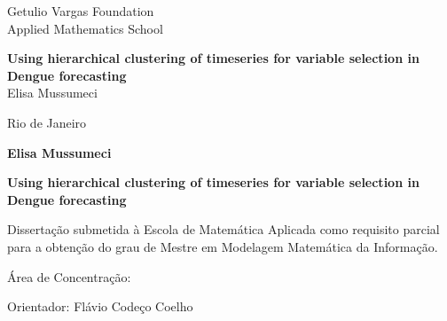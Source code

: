 \documentclass[12pt]{report}
\begin{document}
\begin{titlepage}
\begin{center}
{\LARGE Getulio Vargas Foundation}\\
\vspace{0.3cm}
{\LARGE Applied Mathematics School}\\
\vspace{0.3cm}

\par
\vspace{170pt}
  \textbf{\Large {Using hierarchical clustering of timeseries for variable selection in Dengue forecasting}
}\\
\vspace{32pt}
{\Large Elisa Mussumeci}\\
\end{center}

\par
\vfill
\begin{center}
{{\normalsize Rio de Janeiro}\\
{\normalsize \the\year}}
\end{center}
\end{titlepage}

\thispagestyle{empty}

\newpage
\begin{center}
\textbf{\LARGE Elisa Mussumeci}

\par
\vspace{200pt}
\textbf{\Large Using hierarchical clustering of timeseries for variable selection in Dengue forecasting}
\end{center}

\par
\vspace{85pt}
\hspace*{175pt}\parbox{7.6cm}{{\normalsize Dissertação submetida à Escola de Matemática Aplicada como requisito parcial para a obtenção do grau de Mestre em Modelagem Matemática da Informação.}}

\par
\vspace{1em}
\hspace*{125pt}\parbox{10.0cm}{{\normalsize Área de Concentração: }}

\par
\vspace{1em}
\hspace*{125pt}\parbox{10.0cm}{{\normalsize Orientador: Flávio Codeço Coelho}}\\
\end{document}
